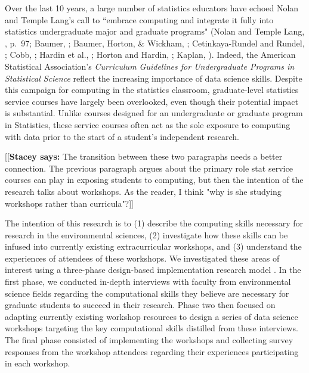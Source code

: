 \documentclass[12pt]{article}
\newcommand{\stacey}[1]{{\color{purple}[[\textbf{Stacey says: }#1]]}}
\begin{document}
\quad Over the last 10 years, a large number of statistics educators have echoed
Nolan and Temple Lang's call to ``embrace computing and integrate it fully into 
statistics undergraduate major and graduate programs" (Nolan and Temple Lang, 
\citeyear{nolan}, p.\ 97; Baumer, \citeyear{baumer_datascience}; Baumer, Horton, 
\& Wickham, \citeyear{horton_takingachance}; Cetinkaya-Rundel and Rundel, 
\citeyear{mine}; Cobb, \citeyear{cobb}; Hardin et al., \citeyear{hardin}; Horton
and Hardin, \citeyear{horton_thinkwithdata}; Kaplan, \citeyear{kaplan}). Indeed,
the American Statistical Association's \citeyear{asa} \emph{Curriculum
Guidelines for Undergraduate Programs in Statistical Science} reflect the
increasing importance of data science skills.
Despite this campaign for computing in the statistics classroom, graduate-level 
statistics service courses have largely been overlooked, even though their 
potential impact is substantial. Unlike courses designed for an undergraduate or
graduate program in Statistics, these service courses often act as the sole 
exposure to computing with data prior to the start of a student's independent 
research. 

\stacey{The transition between these two paragraphs needs a better connection.
The previous paragraph argues about the primary role stat service courses
can play in exposing students to computing, but then the intention of the research
talks about workshops. As the reader, I think "why is she studying workshops
rather than curricula"?}

\quad The intention of this research is to (1) describe the computing skills 
necessary for research in the environmental sciences, (2) investigate how these 
skills can be infused into currently existing extracurricular workshops, and (3)
understand the experiences of attendees of these workshops. We investigated 
these areas of interest using a three-phase design-based implementation
research model \citep{penuel}. In the first phase, we conducted in-depth
interviews with faculty from environmental science fields regarding the
computational skills they believe are necessary for graduate students to succeed
in their research. Phase two then focused on adapting currently existing
workshop resources to design a series of data science workshops targeting the
key computational skills distilled from these interviews. The final phase
consisted of implementing the workshops and collecting survey responses from the
workshop attendees regarding their experiences participating in each workshop. \\  
\end{document}
